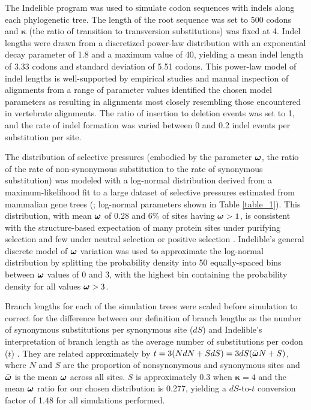 \documentclass{article}
\begin{document}
The Indelible program \citep{Fletcher2009INDELible} was used to
simulate codon sequences with indels along each phylogenetic tree. The
length of the root sequence was set to 500 codons and $\bm{\kappa}$ (the
ratio of transition to transversion substitutions) was fixed at 4.
Indel lengths were drawn from a discretized
power-law distribution with an exponential decay parameter of 1.8 and
a maximum value of 40, yielding a mean indel length of 3.33 codons and
standard deviation of 5.51 codons. This power-law model of indel
lengths is well-supported by empirical studies
\citep{Benner1993Empirical,Cartwright2009Problems} and manual
inspection of alignments from a range of parameter values identified
the chosen model parameters as resulting in alignments most closely
resembling those encountered in vertebrate alignments. The ratio of
insertion to deletion events was set to 1, and the rate of indel
formation was varied between 0 and 0.2 indel events per substitution
per site.

The distribution of \sw selective pressures (embodied by the parameter
$\bm{\omega}$, the ratio of the rate of non-synonymous substitution to the
rate of synonymous substitution) was modeled with a log-normal
distribution derived from a maximum-likelihood fit to a large dataset
of \sw selective pressures estimated from mammalian gene trees
(\citeyearpar{LindbladToh2011High}; log-normal parameters shown in Table
\ref{table_1}). This distribution, with mean $\bm{\omega}$ of 0.28 and 6\% of
sites having $\bm{\omega}>1$, is consistent with the structure-based
expectation of many protein sites under purifying selection and few
under neutral selection or positive selection
\citep{Smith1970Natural,Kimura1974SomePrinciples}. Indelible's general
discrete model of \sw $\bm{\omega}$ variation was used to approximate the
log-normal distribution by splitting the probability density into 50
equally-spaced bins between $\bm{\omega}$ values of 0 and 3, with the highest
bin containing the probability density for all values $\bm{\omega}>3$.

Branch lengths for each of the simulation trees were scaled before
simulation to correct for the difference between our definition of
branch lengths as the number of synonymous substitutions per
synonymous site ($dS$) and Indelible's interpretation of branch length
as the average number of substitutions per codon ($t$)
\citep{Fletcher2010Effect}. They are related approximately by
$t=3(NdN+SdS) = 3dS(\bar{\bm{\omega}{}}N+S)$, where $N$ and $S$ are the
proportion of nonsynonymous and synonymous sites and $\bar{\bm{\omega}}$ is
the mean $\bm{\omega}$ across all sites. $S$ is approximately 0.3 when
$\bm{\kappa}=4$ \citep{Yang1998Synonymous} and the mean $\bm{\omega}$ ratio
for our chosen distribution is 0.277, yielding a $dS$-to-$t$
conversion factor of 1.48 for all simulations performed.
\end{document}
